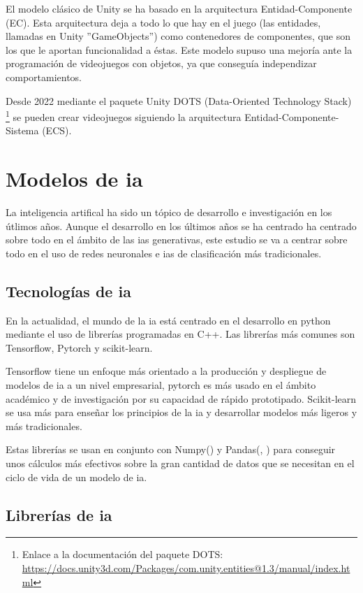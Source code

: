 El modelo clásico de Unity se ha basado en la arquitectura Entidad-Componente (EC).
Esta arquitectura deja a todo lo que hay en el juego (las entidades, llamadas en Unity ''GameObjects'') como contenedores de componentes, que son los que le aportan funcionalidad a éstas.
Este modelo supuso una mejoría ante la programación de videojuegos con objetos, ya que conseguía independizar comportamientos.

Desde 2022 mediante el paquete Unity DOTS (Data-Oriented Technology Stack) \footnote{Enlace a la documentación del paquete DOTS: \url{https://docs.unity3d.com/Packages/com.unity.entities@1.3/manual/index.html}} se pueden crear videojuegos siguiendo la arquitectura Entidad-Componente-Sistema (ECS).

\section{Modelos de \gls{ia}}

La inteligencia artifical ha sido un tópico de desarrollo e investigación en los útlimos años. Aunque el desarrollo en los últimos años se ha centrado ha centrado sobre todo en el ámbito de las \glspl{ia} generativas, este estudio se va a centrar sobre todo en el uso de redes neuronales e \glspl{ia} de clasificación más tradicionales.

\subsection{Tecnologías de \gls{ia}}

En la actualidad, el mundo de la \gls{ia} está centrado en el desarrollo en python mediante el uso de librerías programadas en C++. Las librerías más comunes son Tensorflow, Pytorch y scikit-learn.

Tensorflow tiene un enfoque más orientado a la producción y despliegue de modelos de \gls{ia} a un nivel empresarial, pytorch es más usado en el ámbito académico y de investigación por su capacidad de rápido prototipado. Scikit-learn se usa más para enseñar los principios de la \gls{ia} y desarrollar modelos más ligeros y más tradicionales.

Estas librerías se usan en conjunto con Numpy(\cite{harris2020array}) y Pandas(\cite{reback2020pandas}, \cite{mckinney-proc-scipy-2010}) para conseguir unos cálculos más efectivos sobre la gran cantidad de datos que se necesitan en el ciclo de vida de un modelo de \gls{ia}.

\subsection{Librerías de \gls{ia}}

